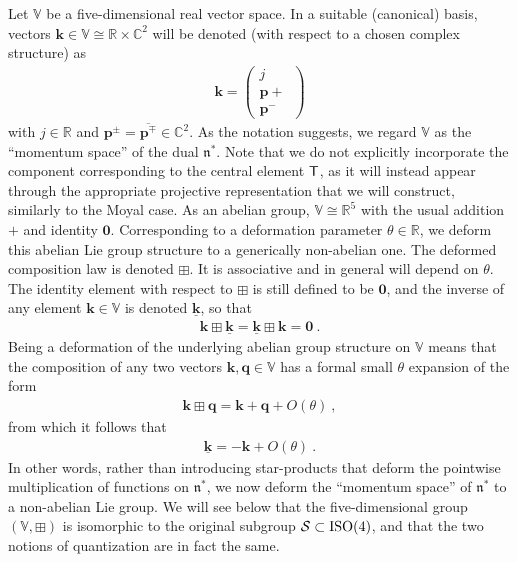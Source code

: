 \documentclass[11pt,a4paper]{article}
\newcommand{\comp}{\boxplus}                            %
\newcommand{\mbf}[1]{{\boldsymbol {#1} }}
\def\T{{\sf T}}
\def\mk{{\mbf k}}
\def\mq{{\mbf q}}
\def\mbp{{\mbf p}}
\def\mfn{{\mathfrak n}}
\newcommand{\complex}{{\mathbb C}} %
\newcommand{\real}{{\mathbb R}} %
\newcommand{\beq}{\begin{eqnarray}}
\newcommand{\eeq}{\end{eqnarray}}
\begin{document}
Let $\mathbb{V}$ be a five-dimensional real vector space. In a
suitable (canonical) basis, vectors
$\mk\in\mathbb{V}\cong\real\times\complex^2$ will be denoted (with
respect to a chosen complex structure) as
\beq
\mk=\begin{pmatrix}j\\\mbp+\,\\\mbp^-\end{pmatrix}
\label{Svectors}\eeq
with $j\in\real$ and $\mbp^\pm=\overline{\mbp^\mp}\in\complex^2$. As
the notation suggests, we
regard $\mathbb{V}$ as the ``momentum space'' of the dual
$\mfn^*$. Note that we do not explicitly incorporate the component
corresponding to the central element $\T$, as it will instead appear
through the appropriate projective representation that we will construct,
similarly to the Moyal case. As an abelian group,
$\mathbb{V}\cong\real^5$ with the usual addition $+$ and identity
$\mbf0$. Corresponding to a deformation parameter
$\theta\in\real$, we deform this abelian Lie group structure to a
generically non-abelian one. The deformed composition law is denoted
$\comp$. It is associative and in general will depend on
$\theta$. The identity element with respect to $\comp$ is still
defined to be $\mbf0$, and the inverse of any element $\mk\in\mathbb{V}$
is denoted $\underline{\mk}$, so that
\beq
\mk\comp\underline{\mk}=\underline{\mk}\comp\mk=\mbf0 \ .
\label{compinverse}\eeq
Being a deformation of the underlying abelian group structure on
$\mathbb{V}$ means that the composition of any two vectors
$\mk,\mq\in\mathbb{V}$ has a formal small $\theta$ expansion of the
form
\beq
\mk\comp\mq=\mk+\mq+O(\theta) \ ,
\label{compsmalltheta}\eeq
from which it follows that
\beq
\underline{\mk}=-\mk+O(\theta) \ .
\label{compinvsmalltheta}\eeq
In other words, rather than introducing star-products that deform the
pointwise multiplication of functions on $\mfn^*$, we now deform the
``momentum space'' of $\mfn^*$ to a non-abelian Lie group.
We will see below that the five-dimensional group
$(\mathbb{V},\comp)$ is isomorphic to the original subgroup
$\mathcal{S}\subset{\rm ISO}(4)$, and that the two notions of
quantization are in fact the same.
\end{document}
